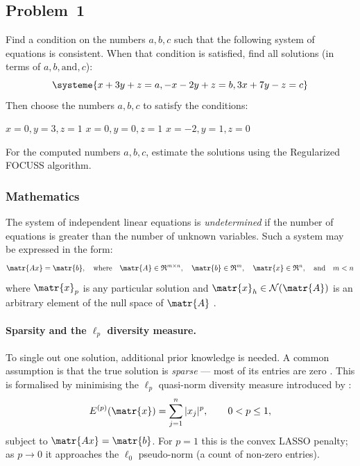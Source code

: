 \subsection{Problem~1}%
\label{problem:1}

Find a condition on the numbers $a, b, c$ such that the following system of equations is consistent.
When that condition is satisfied, find all solutions
(in terms of $a, b, \text{and}, c$):
\begin{equation*}
  \systeme{x+3y+z=a,
  -x-2y+z=b,
  3x+7y-z=c}
\end{equation*}
Then choose the numbers $a, b, c$ to satisfy the conditions:
\begin{tasks}
  \task $x=0, y=3, z=1$
  \task $x=0, y=0, z=1$
  \task $x=-2, y=1, z=0$
\end{tasks}
For the computed numbers $a, b, c$, estimate the solutions using the Regularized FOCUSS algorithm.

\subsubsection*{Mathematics}

The system of independent linear equations is \textit{undetermined} if the
number of equations is greater than the number of unknown variables.
Such a system may be expressed in the form:
\begin{equation*}
  \matr{Ax}=\matr{b}, \quad \text{where} \quad
  \matr{A}\in\mathfrak{R}^{m\times{}n}, \quad
  \matr{b}\in\mathfrak{R}^m, \quad
  \matr{x}\in\mathfrak{R}^n, \quad \text{and} \quad m<{}n
\end{equation*}
where $\matr{x}_p$ is any particular solution and
$\matr{x}_h\in\mathcal{N}(\matr{A})$ is an arbitrary element of the null space
of $\matr{A}$ \citep{Meyer}.

\paragraph{Sparsity and the $\ell_p$ diversity measure.}
To single out one solution, additional prior knowledge is needed.
A common assumption is that the true solution is \textit{sparse} --- most of
its entries are zero \citep{Zdunek}.
This is formalised by minimising the $\ell_p$ quasi-norm diversity measure
introduced by \citet{GorodRao97}:
\begin{equation*}
  E^{(p)}(\matr{x}) = \sum_{j=1}^{n} |x_j|^p, \qquad 0 < p \leq 1,
\end{equation*}
subject to $\matr{Ax}=\matr{b}$.
For $p=1$ this is the convex LASSO penalty; as $p\to 0$ it approaches the
$\ell_0$ pseudo-norm (a count of non-zero entries).


